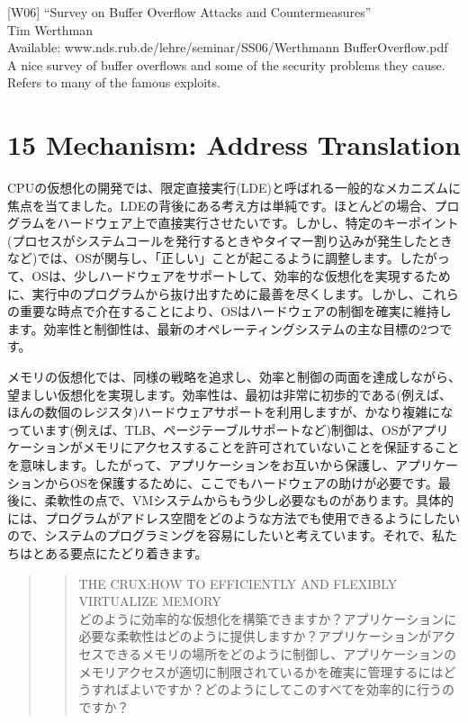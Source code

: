 {[}W06{]} ``Survey on Buffer Overflow Attacks and Countermeasures''\\
Tim Werthman\\
Available: www.nds.rub.de/lehre/seminar/SS06/Werthmann
BufferOverflow.pdf\\
A nice survey of buffer overflows and some of the security problems they
cause. Refers to many of the famous exploits.

\hypertarget{mechanism-address-translation}{%
\section*{15 Mechanism: Address
Translation}\label{mechanism-address-translation}}

CPUの仮想化の開発では、限定直接実行(LDE)と呼ばれる一般的なメカニズムに焦点を当てました。LDEの背後にある考え方は単純です。ほとんどの場合、プログラムをハードウェア上で直接実行させたいです。しかし、特定のキーポイント(プロセスがシステムコールを発行するときやタイマー割り込みが発生したときなど)では、OSが関与し、「正しい」ことが起こるように調整します。したがって、OSは、少しハードウェアをサポートして、効率的な仮想化を実現するために、実行中のプログラムから抜け出すために最善を尽くします。しかし、これらの重要な時点で介在することにより、OSはハードウェアの制御を確実に維持します。効率性と制御性は、最新のオペレーティングシステムの主な目標の2つです。

メモリの仮想化では、同様の戦略を追求し、効率と制御の両面を達成しながら、望ましい仮想化を実現します。効率性は、最初は非常に初歩的である(例えば、ほんの数個のレジスタ)ハードウェアサポートを利用しますが、かなり複雑になっています(例えば、TLB、ページテーブルサポートなど)制御は、OSがアプリケーションがメモリにアクセスすることを許可されていないことを保証することを意味します。したがって、アプリケーションをお互いから保護し、アプリケーションからOSを保護するために、ここでもハードウェアの助けが必要です。最後に、柔軟性の点で、VMシステムからもう少し必要なものがあります。具体的には、プログラムがアドレス空間をどのような方法でも使用できるようにしたいので、システムのプログラミングを容易にしたいと考えています。それで、私たちはとある要点にたどり着きます。

\begin{quote}
\begin{quote}
THE CRUX:HOW TO EFFICIENTLY AND FLEXIBLY VIRTUALIZE MEMORY\\
どのように効率的な仮想化を構築できますか？アプリケーションに必要な柔軟性はどのように提供しますか？アプリケーションがアクセスできるメモリの場所をどのように制御し、アプリケーションのメモリアクセスが適切に制限されているかを確実に管理するにはどうすればよいですか？どのようにしてこのすべてを効率的に行うのですか？
\end{quote}
\end{quote}

